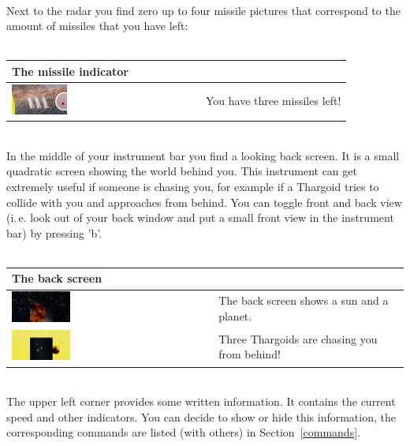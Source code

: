 \documentclass[a4paper,11pt]{article}
\begin{document}
\ \\
Next to the radar you find zero up to four missile pictures that correspond to the amount of missiles that you have left:\\
\ \\
\begin{tabularx}{\textwidth}{|m{}|X|}
	\hline
	  \multicolumn{2}{|l|}{\textbf{The missile indicator\label{missileindicator}}}\\
  \hline
    \includegraphics[width=0.3\textwidth]{threemissilesleft.jpg}    & You have three missiles left!\\
  \hline
\end{tabularx}
\ \\
In the middle of your instrument bar you find a looking back screen. It is a small quadratic screen showing the world behind you. This instrument can get extremely useful if someone is chasing you, for example if a Thargoid tries to collide with you and approaches from behind. You can toggle front and back view (i.\,e. look out of your back window and put a small front view in the instrument bar) by pressing 'b'.\\
\ \\
\begin{tabularx}{\textwidth}{|m{}|X|}
	\hline
	  \multicolumn{2}{|l|}{\textbf{The back screen\label{backscreen}}}\\
  \hline
    \includegraphics[width=0.3\textwidth]{back1.jpg}    & The back screen shows a sun and a planet. \\
    \includegraphics[width=0.3\textwidth]{back2.jpg}    & Three Thargoids are chasing you from behind! \\
  \hline
\end{tabularx}
\ \\
The upper left corner provides some written information. It contains the current speed and other indicators. You can decide to show or hide this information, the corresponding commands are listed (with others) in Section~\ref{commands}.
\end{document}
